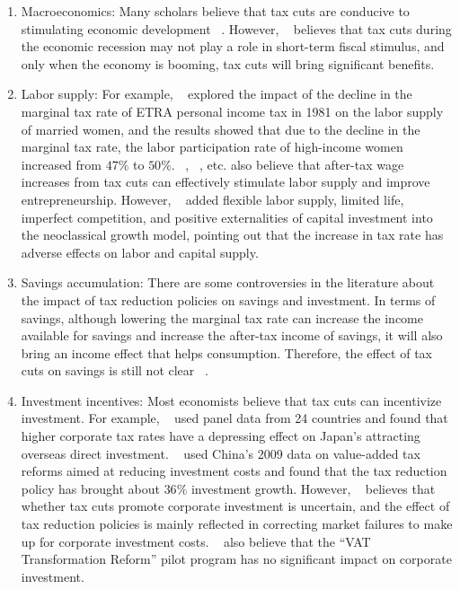 \documentclass[3p,times]{elsarticle}
\begin{document}
\begin{enumerate}[(1)]
    \item Macroeconomics: Many scholars believe that tax cuts are conducive to stimulating economic development ~\cite{lucas201214, garrison1992taxation}. However, ~\citet{giannitsarou2006supply} believes that tax cuts during the economic recession may not play a role in short-term fiscal stimulus, and only when the economy is booming, tax cuts will bring significant benefits.
    
    \item Labor supply: For example, ~\citet{eissa20081} explored the impact of the decline in the marginal tax rate of ETRA personal income tax in 1981 on the labor supply of married women, and the results showed that due to the decline in the marginal tax rate, the labor participation rate of high-income women increased from $47\%$ to $50\%$. ~\citet{kniesner2008evidence}, ~\citet{moore2002effects}, etc. also believe that after-tax wage increases from tax cuts can effectively stimulate labor supply and improve entrepreneurship. However, ~\citet{mankiw2006dynamic} added flexible labor supply, limited life, imperfect competition, and positive externalities of capital investment into the neoclassical growth model, pointing out that the increase in tax rate has adverse effects on labor and capital supply. 
    
    \item Savings accumulation: There are some controversies in the literature about the impact of tax reduction policies on savings and investment. In terms of savings, although lowering the marginal tax rate can increase the income available for savings and increase the after-tax income of savings, it will also bring an income effect that helps consumption. Therefore, the effect of tax cuts on savings is still not clear ~\cite{kniesner2008evidence}.
    
    \item Investment incentives: Most economists believe that tax cuts can incentivize investment. For example, ~\citet{liuhong2017} used panel data from 24 countries and found that higher corporate tax rates have a depressing effect on Japan's attracting overseas direct investment. ~\citet{chen2019tax} used China's 2009 data on value-added tax reforms aimed at reducing investment costs and found that the tax reduction policy has brought about $36\%$ investment growth. However, ~\citet{zee2002tax} believes that whether tax cuts promote corporate investment is uncertain, and the effect of tax reduction policies is mainly reflected in correcting market failures to make up for corporate investment costs. ~\citet{zhong2011value} also believe that the “VAT Transformation Reform” pilot program has no significant impact on corporate investment.
    

\end{enumerate}
\end{document}
